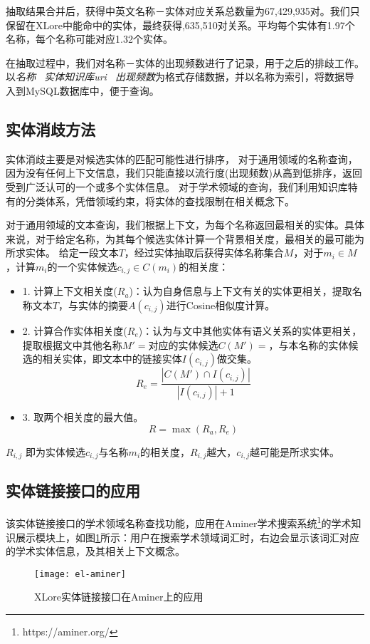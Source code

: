 抽取结果合并后，获得中英文名称－实体对应关系总数量为67,429,935对。我们只保留在XLore中能命中的实体，最终获得{,635,510}对关系。平均每个实体有1.97个名称，每个名称可能对应1.32个实体。

在抽取过程中，我们对名称－实体的出现频数进行了记录，用于之后的排歧工作。以\textit{名称 \ 实体知识库uri \ 出现频数}为格式存储数据，并以名称为索引，将数据导入到MySQL数据库中，便于查询。

\subsection{实体消歧方法}
实体消歧主要是对候选实体的匹配可能性进行排序，
对于通用领域的名称查询，因为没有任何上下文信息，我们只能直接以流行度(出现频数)从高到低排序，返回受到广泛认可的一个或多个实体信息。
对于学术领域的查询，我们利用知识库特有的分类体系，凭借领域约束，将实体的查找限制在相关概念下。

对于通用领域的文本查询，我们根据上下文，为每个名称返回最相关的实体。具体来说，对于给定名称，为其每个候选实体计算一个背景相关度，最相关的最可能为所求实体。
给定一段文本$T$，经过实体抽取后获得实体名称集合$M$，对于$m_i \in M$，计算$m_i$的一个实体候选$c_{i,j} \in C(m_i)$的相关度：
\begin{itemize}
\item 1.  计算上下文相关度($R_a$)：认为自身信息与上下文有关的实体更相关，提取名称文本$T$，与实体的摘要$A(c_{i,j})$进行Cosine相似度计算。

\item 2.  计算合作实体相关度($R_e$)：认为与文中其他实体有语义关系的实体更相关，提取根据文中其他名称$M'=$对应的实体候选$C(M') = $，与本名称的实体候选的相关实体，即文本中的链接实体$I(c_{i,j})$做交集。
\begin{equation}
{ R }_{ e }=\frac { \left| C\left( M' \right) \cap I\left( { c }_{ i,j } \right)  \right|  }{ \left| I\left( { c }_{ i,j } \right)  \right| +1 }
\end{equation}

\item 3.  取两个相关度的最大值。
\begin{equation}
R = \max{ \left(R_a, R_e \right)}
\end{equation}
\end{itemize}
$R_{i,j}$ 即为实体候选$c_{i,j}$与名称$m_i$的相关度，$R_{i,j}$越大，$c_{i,j}$越可能是所求实体。

\subsection{实体链接接口的应用}
该实体链接接口的学术领域名称查找功能，应用在Aminer学术搜索系统\footnote{https://aminer.org/}的学术知识展示模块上，如图\ref{fig:el-aminer}所示：用户在搜索学术领域词汇时，右边会显示该词汇对应的学术实体信息，及其相关上下文概念。
\begin{figure}[H]
  \centering
  \texttt{[image: el-aminer]}
  \caption{XLore实体链接接口在Aminer上的应用}
  \label{fig:el-aminer}
\end{figure}

